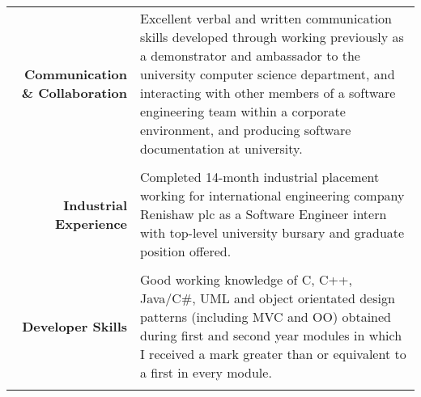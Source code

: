 \documentclass[a4paper, 10pt]{extarticle} %
\begin{document}
\begin{small}
\begin{tabular}{r | p{12cm}}

	\begin{minipage}[t]{2.5cm}
		\begin{flushright}
			\textbf{Communication \& Collaboration}
		\end{flushright}
	\end{minipage} 
		
		& 
		
		Excellent verbal and written communication skills developed through working previously as a demonstrator and ambassador to the university computer science department, and interacting with other members of a software engineering team within a corporate environment, and producing software documentation at university. \\
		
		\multicolumn{2}{c}{} \\
			
		\begin{minipage}[t]{2.5cm}
		\begin{flushright}
			\textbf{Industrial Experience}
		\end{flushright}
		\end{minipage} 
		
		& 
		
		Completed 14-month industrial placement working for international engineering company Renishaw plc as a Software Engineer intern with top-level university bursary and graduate position offered. \\

	\multicolumn{2}{c}{} \\
	
	\begin{minipage}[t]{2.5cm}
		\begin{flushright}
			\textbf{Developer Skills}
		\end{flushright}
		\end{minipage} 
		
		& 
		
		Good working knowledge of C, C++, Java/C\#, UML and object orientated design patterns (including MVC and OO) obtained during first and second year modules in which I received a mark greater than or equivalent to a first in every module. \\
		
		\multicolumn{2}{c}{} \\
	

\end{tabular}
\end{small}
\end{document}
